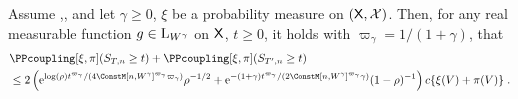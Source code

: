 \begin{lemma}
  \label{lem:prob_ineq_non_statio_v_norm}
  Assume ,, and let $\gamma \geq 0$, $\xi$ be a probability measure on $(\mathsf{X},\mathcal{X})$.   Then, for any real measurable function $g \in \mathrm{L}_{W^{\gamma}}$ on $\mathsf{X}$, $t \geq 0$,  it holds with  $\varpi_{\gamma} = 1/(1+\gamma)$, that
  \begin{align*}
&    \PPcoupling[\xi,\pi](S_{T,n} \geq t) +     \PPcoupling[\xi,\pi](S_{T',n} \geq t) \\
    &\leq 2 \parenthese{\rme^{\log(\rho)t^{\varpi_{\gamma}}/(4\ConstM[n,W^{\gamma}]^{\varpi_{\gamma}}\varpi_{\gamma})}\ratev^{-1/2} +   \rme^{-(1+\gamma) t^{\varpi_{\gamma}}/(2\ConstM[n,W^{\gamma}]^{\varpi_{\gamma}}\gamma)} (1-\ratev)^{-1} }\cmconstv \{ \xi(V) + \pi(V) \} \eqsp.
  \end{align*}
\end{lemma}
